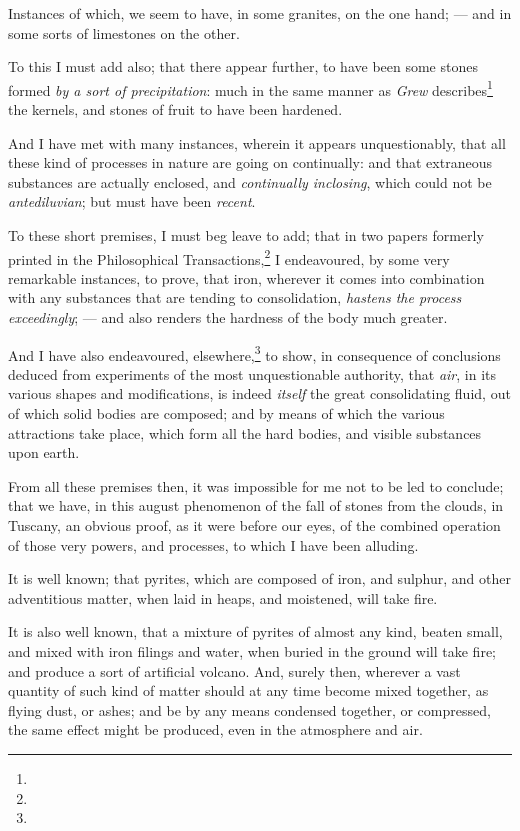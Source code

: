 \documentclass[a4paper, 12pt, oneside]{article}
\begin{document}
Instances of which, we seem to have, in some granites, on the one hand; --- and in some sorts of limestones on the other.

To this I must add also; that there appear further, to have been some stones formed \emph{by a sort of precipitation}: much in the same manner as \emph{Grew} describes\footnote{} the kernels, and stones of fruit to have been hardened.

And I have met with many instances, wherein it appears unquestionably, that all these kind of processes in nature are going on continually: and that extraneous substances are actually enclosed, and \emph{continually inclosing}, which could not be \emph{antediluvian}; but must have been \emph{recent}.

To these short premises, I must beg leave to add; that in two papers formerly printed in the Philosophical Transactions,\footnote{} I endeavoured, by some very remarkable instances, to prove, that iron, wherever it comes into combination with any substances that are tending to consolidation, \emph{hastens the process exceedingly}; --- and also renders the hardness of the body much greater.

And I have also endeavoured, elsewhere,\footnote{} to show, in consequence of conclusions deduced from experiments of the most unquestionable authority, that \emph{air}, in its various shapes and modifications, is indeed \emph{itself} the great consolidating fluid, out of which solid bodies are composed; and by means of which the various attractions take place, which form all the hard bodies, and visible substances upon earth.

From all these premises then, it was impossible for me not to be led to conclude; that we have, in this august phenomenon of the fall of stones from the clouds, in Tuscany, an obvious proof, as it were before our eyes, of the combined operation of those very powers, and processes, to which I have been alluding.

It is well known; that pyrites, which are composed of iron, and sulphur, and other adventitious matter, when laid in heaps, and moistened, will take fire.

It is also well known, that a mixture of pyrites of almost any kind, beaten small, and mixed with iron filings and water, when buried in the ground will take fire; and produce a sort of artificial volcano. And, surely then, wherever a vast quantity of such kind of matter should at any time become mixed together, as flying dust, or ashes; and be by any means condensed together, or compressed, the same effect might be produced, even in the atmosphere and air.
\end{document}
